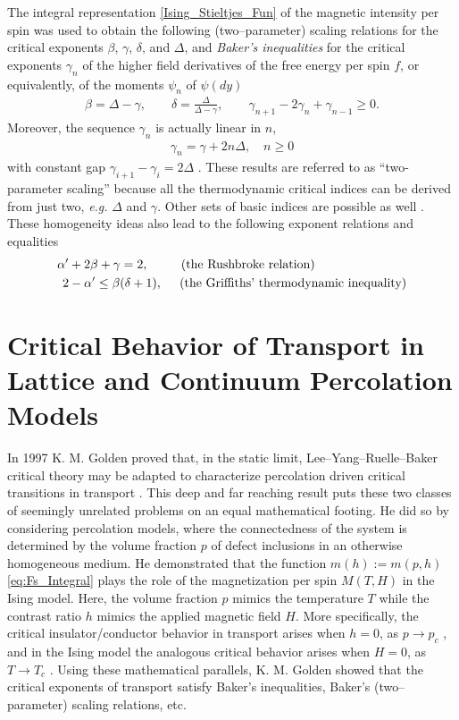 \documentclass[english,12pt]{ttuthes}
\begin{document}
The integral representation \eqref{Ising_Stieltjes_Fun} of the
magnetic intensity per spin was used to obtain the following
(two--parameter) scaling relations for the critical exponents $\beta$,
$\gamma$, $\delta$, and $\Delta$, and \emph{Baker's inequalities} for the critical
exponents $\gamma_n$ of the higher field derivatives of the free energy per
spin $f$, or equivalently, of the moments $\psi_n$ of $\psi(dy)$
\cite{Baker:PR:434,Baker:PRL-990,Baker-1990}   
%
\begin{align}
  \beta=\Delta-\gamma, \qquad \delta=\frac{\Delta}{\Delta-\gamma}, \qquad \gamma_{n+1}-2\gamma_n+\gamma_{n-1}\geq0.
\end{align}
%
Moreover, the sequence $\gamma_n$ is actually linear in $n$,
%
\begin{align}
  \gamma_n=\gamma+2n\Delta,\quad n\geq0
\end{align}
%
with constant gap $\gamma_{i+1}-\gamma_i=2\Delta$
\cite{Baker:PR:434,Baker:PRL-990,Baker-1990}. These results are
referred to as ``two-parameter scaling'' because  all the
thermodynamic critical indices can be derived from just two,
\textit{e.g.} $\Delta $ and $\gamma $. Other sets of basic indices are possible
as well \cite{Baker-1990}. These homogeneity ideas also lead to the
following exponent relations and equalities \cite{Baker-1990}
% 
\begin{align} \label{eq:Tpm_Exponent_Relations}  
  \alpha^{\prime } &+ 2\beta + \gamma = 2, \hspace{0.36in} (\text{the Rushbroke relation})
\\
  2 &- \alpha^{\prime } \leq \beta(\delta + 1), \hspace{0.19in}
   (\text{the Griffiths' thermodynamic inequality})\notag
\end{align}
%
\section{Critical Behavior of Transport in Lattice and Continuum
  Percolation Models}
\label{sec:Crit_Behav_of_Transport}
%
In 1997 K. M. Golden proved that, in the static limit,
Lee--Yang--Ruelle--Baker critical theory may be adapted to
characterize percolation driven critical transitions in transport  
\cite{Golden:PRL-3935}. This deep and far reaching result puts these
two classes of seemingly unrelated problems on an equal mathematical
footing. He did so by considering percolation models, where the
connectedness of the system is determined by the volume fraction $p$
of defect inclusions in an otherwise homogeneous medium. He
demonstrated that the function $m(h):=m(p,h)$ \eqref{eq:Fs_Integral}
plays the role of the magnetization per spin $M(T,H)$ in the Ising
model. Here, the volume fraction $p$ mimics the temperature $T$
while the contrast ratio $h$ mimics the applied magnetic field
$H$. More specifically, the critical insulator/conductor behavior in
transport arises when $h=0$, as $p\to p_c$ \cite{Golden:PRL-3935}, and
in the Ising model the analogous critical behavior arises when $H=0$,
as $T\to T_c$ \cite{Christensen-2005}. Using these mathematical
parallels, K. M. Golden showed that the critical exponents of
transport satisfy Baker's inequalities, Baker's (two--parameter) scaling
relations, etc.  
\end{document}
